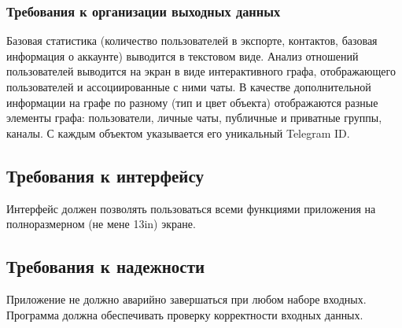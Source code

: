 \subsubsection{Требования к организации выходных данных}

Базовая статистика (количество пользователей в экспорте, контактов, базовая информация о аккаунте) выводится в текстовом виде.
Анализ отношений пользователей выводится на экран в виде интерактивного графа, отображающего пользователей и ассоциированные с ними чаты.
В качестве дополнительной информации на графе по разному (тип и цвет объекта) отображаются разные элементы графа: пользователи, личные чаты, публичные и приватные группы, каналы.
С каждым объектом указывается его уникальный Telegram ID.

\subsection{Требования к интерфейсу}

Интерфейс должен позволять пользоваться всеми функциями приложения на полноразмерном (не мене 13in) экране.

\subsection{Требования к надежности}

Приложение не должно аварийно завершаться при любом наборе входных. 
Программа должна обеспечивать проверку корректности входных данных.